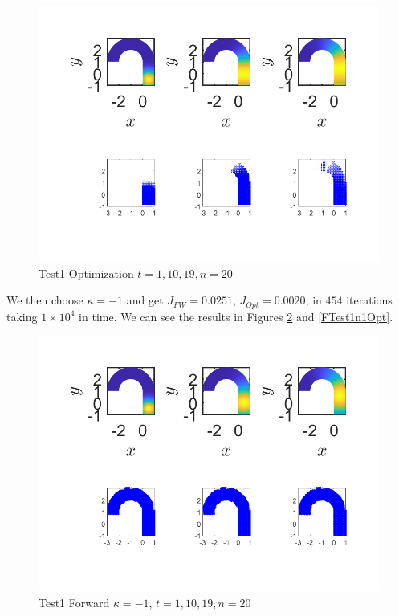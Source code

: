 \documentclass[11pt, a4paper]{article}
\theoremstyle{definition}
\begin{document}
    \begin{figure}[h]
    	\centering
    	\includegraphics[scale=0.7]{Test10Opt.png}
    	\caption{Test1 Optimization $t =1, 10, 19, n = 20$} 
    	\label{FTest1Opt}
    \end{figure}
    We then choose $\kappa = -1$ and get $J_{FW} = 0.0251$, $J_{Opt} = 0.0020$, in $454$ iterations taking $ 1\times 10^4$ in time. We can see the results in Figures \ref{FTest1n1FW} and \ref{FTest1n1Opt}.
    \begin{figure}[h]
    	\centering
    	\includegraphics[scale=0.7]{Test10n1FW.png}
    	\caption{Test1 Forward $\kappa = -1$, $t =1, 10, 19, n = 20$} 
    	\label{FTest1n1FW}
    \end{figure}
\end{document}
